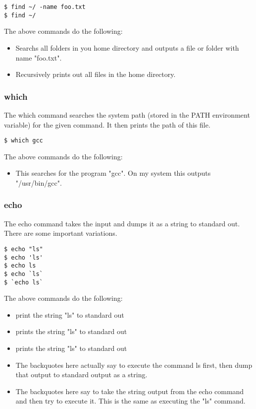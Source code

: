 \begin{lstlisting}
$ find ~/ -name foo.txt
$ find ~/
\end{lstlisting}

The above commands do the following:
	\begin{itemize}
		\item Searchs all folders in you home directory and outputs a file or folder with name "foo.txt".
		\item Recursively prints out all files in the home directory.
	\end{itemize}


\subsubsection{which} \mdseries
The which command searches the system path (stored in the PATH environment variable) for the given command.  It then prints the path of this file.

\begin{lstlisting}
$ which gcc
\end{lstlisting}

The above commands do the following:
	\begin{itemize}
		\item This searches for the program "gcc".  On my system this outputs "/usr/bin/gcc".
	\end{itemize}

\subsubsection{echo} \mdseries
The echo command takes the input and dumps it as a string to standard out.  There are some important variations.

\begin{lstlisting}
$ echo "ls"
$ echo 'ls'
$ echo ls
$ echo `ls`
$ `echo ls`
\end{lstlisting}

The above commands do the following:
	\begin{itemize}
		\item print the string "ls" to standard out
		\item prints the string "ls" to standard out
		\item prints the string "ls" to standard out
		\item The backquotes here actually say to execute the command ls first, then dump that output to standard output as a string.
		\item The backquotes here say to take the string output from the echo command and then try to execute it.  This is the same as executing the "ls" command.
	\end{itemize}

